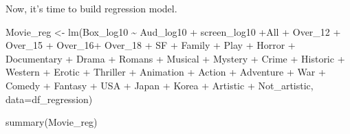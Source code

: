 \documentclass[
]{article}
\newenvironment{Shaded}{\begin{snugshade}}{\end{snugshade}}
\newcommand{\AttributeTok}[1]{\textcolor[rgb]{0.77,0.63,0.00}{#1}}
\newcommand{\DecValTok}[1]{\textcolor[rgb]{0.00,0.00,0.81}{#1}}
\newcommand{\FunctionTok}[1]{\textcolor[rgb]{0.00,0.00,0.00}{#1}}
\newcommand{\NormalTok}[1]{#1}
\newcommand{\OtherTok}[1]{\textcolor[rgb]{0.56,0.35,0.01}{#1}}
\newcommand{\SpecialCharTok}[1]{\textcolor[rgb]{0.00,0.00,0.00}{#1}}
\begin{document}
\begin{Shaded}
\end{Shaded}

Now, it's time to build regression model.

\begin{Shaded}
\begin{Highlighting}[]
\NormalTok{Movie\_reg }\OtherTok{\textless{}{-}} \FunctionTok{lm}\NormalTok{(Box\_log10 }\SpecialCharTok{\textasciitilde{}}\NormalTok{ Aud\_log10 }\SpecialCharTok{+}\NormalTok{ screen\_log10 }\SpecialCharTok{+}\NormalTok{All }\SpecialCharTok{+}\NormalTok{ Over\_12 }\SpecialCharTok{+}\NormalTok{ Over\_15 }\SpecialCharTok{+}\NormalTok{ Over\_16}\SpecialCharTok{+}\NormalTok{ Over\_18 }\SpecialCharTok{+}\NormalTok{ SF }\SpecialCharTok{+}\NormalTok{ Family }\SpecialCharTok{+}\NormalTok{ Play }\SpecialCharTok{+}\NormalTok{ Horror }\SpecialCharTok{+}\NormalTok{ Documentary }\SpecialCharTok{+}\NormalTok{ Drama }\SpecialCharTok{+}\NormalTok{ Romans }\SpecialCharTok{+}\NormalTok{ Musical }\SpecialCharTok{+}\NormalTok{ Mystery }\SpecialCharTok{+}\NormalTok{ Crime }\SpecialCharTok{+}\NormalTok{ Historic }\SpecialCharTok{+}\NormalTok{ Western }\SpecialCharTok{+}\NormalTok{ Erotic }\SpecialCharTok{+}\NormalTok{ Thriller }\SpecialCharTok{+}\NormalTok{ Animation }\SpecialCharTok{+}\NormalTok{ Action }\SpecialCharTok{+}\NormalTok{ Adventure }\SpecialCharTok{+}\NormalTok{ War }\SpecialCharTok{+}\NormalTok{ Comedy }\SpecialCharTok{+}\NormalTok{ Fantasy }\SpecialCharTok{+}\NormalTok{ USA }\SpecialCharTok{+}\NormalTok{ Japan }\SpecialCharTok{+}\NormalTok{ Korea }\SpecialCharTok{+}\NormalTok{ Artistic }\SpecialCharTok{+}\NormalTok{ Not\_artistic, }\AttributeTok{data=}\NormalTok{df\_regression)}

\FunctionTok{summary}\NormalTok{(Movie\_reg)}
\end{Highlighting}
\end{Shaded}
\end{document}

